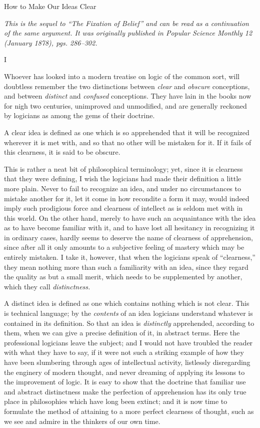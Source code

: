 \documentclass[]{article}
\newcommand{\hbreak}{\par\noindent\begin{tabular*}{\linewidth}{c}\hline\hline\end{tabular*}\par}
\newcommand*{\itemtitle}[1]{\pagebreak[2]\hbreak\begin{center}{\Large\sc #1}\end{center}}
\newcommand*{\itemcomment}[1]{\noindent\emph{#1}}
\newcommand*{\itemsection}[1]{\bigskip\centerline{#1}\nopagebreak}
\begin{document}
\itemtitle{How to Make Our Ideas Clear}
\itemcomment{This is the sequel to ``The Fixation of Belief'' and can be read as a continuation of the same argument. It was originally published in \emph{Popular Science Monthly} 12 (January 1878), pgs. 286--302.}

\itemsection{I}

Whoever has looked into a modern treatise on logic of the common sort, will doubtless remember the two distinctions between \emph{clear} and \emph{obscure} conceptions, and between \emph{distinct} and \emph{confused} conceptions. They have lain in the books now for nigh two centuries, unimproved and unmodified, and are generally reckoned by logicians as among the gems of their doctrine.


A clear idea is defined as one which is so apprehended that it will be recognized wherever it is met with, and so that no other will be mistaken for it. If it fails of this clearness, it is said to be obscure.


This is rather a neat bit of philosophical terminology; yet, since it is clearness that they were defining, I wish the logicians had made their definition a little more plain. Never to fail to recognize an idea, and under no circumstances to mistake another for it, let it come in how recondite a form it may, would indeed imply such prodigious force and clearness of intellect as is seldom met with in this world. On the other hand, merely to have such an acquaintance with the idea as to have become familiar with it, and to have lost all hesitancy in recognizing it in ordinary cases, hardly seems to deserve the name of clearness of apprehension, since after all it only amounts to a subjective feeling of mastery which may be entirely mistaken. I take it, however, that when the logicians speak of ``clearness,'' they mean nothing more than such a familiarity with an idea, since they regard the quality as but a small merit, which needs to be supplemented by another, which they call \emph{distinctness.}

A distinct idea is defined as one which contains nothing which is not clear. This is technical language; by the \emph{contents} of an idea logicians understand whatever is contained in its definition. So that an idea is \emph{distinctly} apprehended, according to them, when we can give a precise definition of it, in abstract terms. Here the professional logicians leave the subject; and I would not have troubled the reader with what they have to say, if it were not such a striking example of how they have been slumbering through ages of intellectual activity, listlessly disregarding the enginery of modern thought, and never dreaming of applying its lessons to the improvement of logic. It is easy to show that the doctrine that familiar use and abstract distinctness make the perfection of apprehension has its only true place in philosophies which have long been extinct; and it is now time to formulate the method of attaining to a more perfect clearness of thought, such as we see and admire in the thinkers of our own time.
\end{document}
